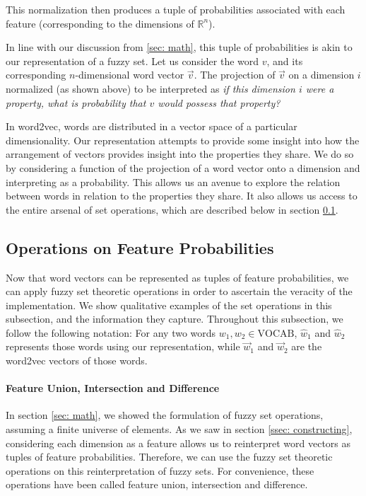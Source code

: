\documentclass[11pt]{book}
\begin{document}
This normalization then produces a tuple of probabilities associated with each
feature (corresponding to the dimensions of $\mathbb{R}^n$).

In line with our discussion from \ref{sec: math}, this tuple of probabilities
is akin to our representation of a fuzzy set. Let us consider the word $v$, and
its corresponding $n$-dimensional word vector $\vec v$. The projection of $\vec
v$ on a dimension $i$ normalized (as shown above) to be interpreted as
\textit{if this dimension $i$ were a property, what is probability that $v$
would possess that property?}

In word2vec, words are distributed in a vector space of a particular
dimensionality. Our representation attempts to provide some insight into how
the arrangement of vectors provides insight into the properties they share. We
do so by considering a function of the projection of a word vector onto a
dimension and interpreting as a probability. This allows us an avenue to
explore the relation between words in relation to the properties they share. It
also allows us access to the entire arsenal of set operations, which are
described below in section \ref{ssec: set operations}.

\subsection{Operations on Feature Probabilities} \label{ssec: set operations}

Now that word vectors can be represented as tuples of feature probabilities, we
can apply fuzzy set theoretic operations in order to ascertain the veracity of
the implementation. We show qualitative examples of the set operations in this
subsection, and the information they capture. Throughout this subsection, we
follow the following notation: For any two words $w_1, w_2 \in \text{VOCAB}$,
$\hat w_1$ and $\hat w_2$ represents those words using our representation,
while $\vec w_1$ and $\vec w_2$ are the word2vec vectors of those words.

\paragraph{Feature Union, Intersection and Difference} In section \ref{sec:
math}, we showed the formulation of fuzzy set operations, assuming a finite
universe of elements. As we saw in section \ref{ssec: constructing},
considering each dimension as a feature allows us to reinterpret word vectors
as tuples of feature probabilities. Therefore, we can use the fuzzy set
theoretic operations on this reinterpretation of fuzzy sets. For convenience,
these operations have been called feature union, intersection and difference.
\end{document}
